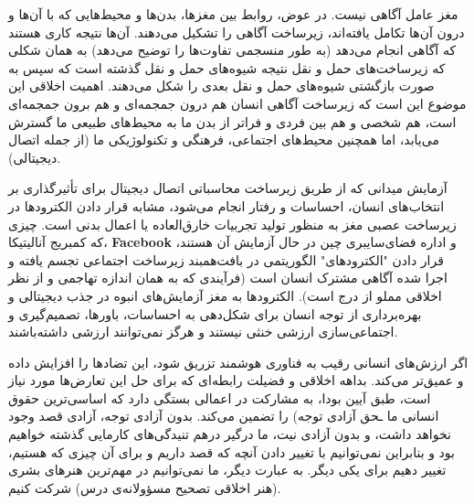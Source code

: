 مغز عامل آگاهی نیست.
در عوض، روابط بین مغزها، بدن‌ها و محیط‌هایی که با آن‌ها و درون آن‌ها تکامل یافته‌اند، زیرساخت آگاهی را تشکیل می‌دهند.
آن‌ها نتیجه کاری هستند که آگاهی انجام می‌دهد (به طور منسجمی تفاوت‌ها را توضیح می‌دهد) به همان شکلی که زیرساخت‌های حمل و نقل نتیجه شیوه‌های حمل و نقل گذشته است که سپس به صورت بازگشتی شیوه‌های حمل و نقل بعدی را شکل می‌دهند.
اهمیت اخلاقی این موضوع این است که زیرساخت آگاهی انسان هم درون جمجمه‌ای و هم برون جمجمه‌ای است، هم شخصی و هم بین فردی و فراتر از بدن ما به محیط‌های طبیعی ما گسترش می‌یابد، اما همچنین محیط‌های اجتماعی، فرهنگی و تکنولوژیکی ما (از جمله اتصال دیجیتالی).

آزمایش میدانی که از طریق زیرساخت محاسباتی اتصال دیجیتال برای تأثیرگذاری بر انتخاب‌های انسان، احساسات و رفتار انجام می‌شود، مشابه قرار دادن الکترودها در زیرساخت عصبی مغز به منظور تولید تجربیات خارق‌العاده یا اعمال بدنی است.
چیزی که کمبریج آنالیتیکا، \textenglish{\textbf{Facebook}} و اداره فضای‌سایبری چین در حال آزمایش آن هستند، قرار دادن "الکترودهای" الگوریتمی در بافت‌همبند زیرساخت اجتماعی تجسم یافته و اجرا شده آگاهی مشترک انسان است (فرآیندی که به همان اندازه تهاجمی و از نظر اخلاقی مملو از درج است).
الکترودها به مغز آزمایش‌های انبوه در جذب دیجیتالی و بهره‌برداری از توجه انسان برای شکل‌دهی به احساسات، باورها، تصمیم‌گیری و اجتماعی‌سازی ارزشی خنثی نیستند و هرگز نمی‌توانند ارزشی داشته‌باشند.

اگر ارزش‌های انسانی رقیب به فناوری هوشمند تزریق شود، این تضادها را افزایش داده و عمیق‌تر می‌کند.
بداهه اخلاقی و فضیلت رابطه‌ای که برای حل این تعارض‌ها مورد نیاز است، طبق آیین بودا، به مشارکت در اعمالی بستگی دارد که اساسی‌ترین حقوق انسانی ما ـحق آزادی توجه) را تضمین می‌کند.
بدون آزادی توجه، آزادی قصد وجود نخواهد داشت، و بدون آزادی نیت، ما درگیر درهم تنیدگی‌های کارمایی گذشته خواهیم بود و بنابراین نمی‌توانیم با تغییر دادن آنچه که قصد داریم و برای آن چیزی که هستیم، تغییر دهیم برای یکی دیگر.
به عبارت دیگر، ما نمی‌توانیم در مهم‌ترین هنرهای بشری (هنر اخلاقی تصحیح مسؤولانه‌ی درس) شرکت کنیم.






